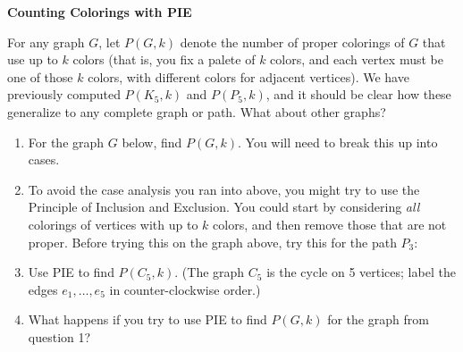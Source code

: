 \documentclass[12pt]{article}
\begin{document}
\begin{center}
  \textbf{Counting Colorings with PIE}
\end{center}

For any graph $G$, let $P(G,k)$ denote the number of proper colorings of $G$ that use up to $k$ colors (that is, you fix a palete of $k$ colors, and each vertex must be one of those $k$ colors, with different colors for adjacent vertices).  We have previously computed $P(K_5, k)$ and $P(P_5,k)$, and it should be clear how these generalize to any complete graph or path.  What about other graphs?

\begin{enumerate}
  \item For the graph $G$ below, find $P(G,k)$.  You will need to break this up into cases.

  \begin{center}
    {\footnotesize
    }
  \end{center}

\vfill

\item To avoid the case analysis you ran into above, you might try to use the Principle of Inclusion and Exclusion.  You could start by considering \emph{all} colorings of vertices with up to $k$ colors, and then remove those that are not proper.  Before trying this on the graph above, try this for the path $P_3$:

\begin{center}
  {\footnotesize
  }
\end{center}


\vfill
\item Use PIE to find $P(C_5,k)$.  (The graph $C_5$ is the cycle on 5 vertices; label the edges $e_1, \ldots, e_5$ in counter-clockwise order.)

\vfill

\item What happens if you try to use PIE to find $P(G,k)$ for the graph from question 1?

\end{enumerate}
\end{document}
